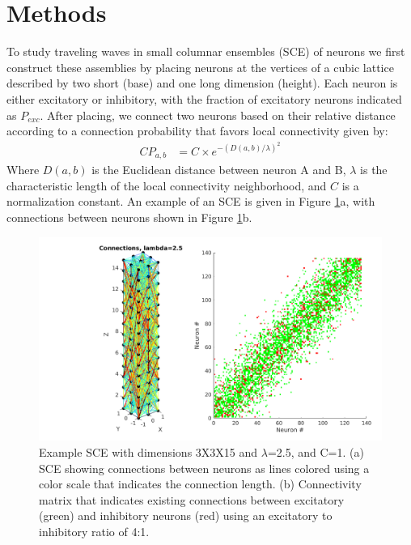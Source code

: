 \documentclass[a4paper,11pt]{article}
\begin{document}
\section{Methods}
To study traveling waves in small columnar ensembles (SCE) of neurons we first construct these assemblies by placing neurons at the vertices of a cubic lattice described by two short (base) and one long dimension (height). 
Each neuron is either excitatory or inhibitory, with the fraction of excitatory neurons indicated as $P_{exc}$.
After placing, we connect two neurons based on their relative distance according to a connection probability that favors local connectivity given by: 
\begin{align}\label{eq:connectivity}
 CP_{a,b} &= C \times e^{-(D(a,b)/\lambda)^2}
\end{align}
Where $D(a,b)$ is the Euclidean distance between neuron A and B, $\lambda$ is the characteristic length of the local connectivity neighborhood, and $C$ is a normalization constant.
An example of an SCE is given in Figure \ref{fig:column_structure}a, with connections between neurons shown in Figure \ref{fig:column_structure}b.
\begin{figure}[!ht]
 \caption{Example SCE with dimensions 3X3X15 and $\lambda$=2.5, and C=1. (a) SCE showing connections between neurons as lines colored using a color scale that indicates the connection length. (b) Connectivity matrix that indicates existing connections between excitatory (green) and inhibitory neurons (red) using an excitatory to inhibitory ratio of 4:1. }
 \label{fig:column_structure}
 \centering
   \includegraphics[width=\textwidth]{fig/lambda2}
\end{figure}
\end{document}
